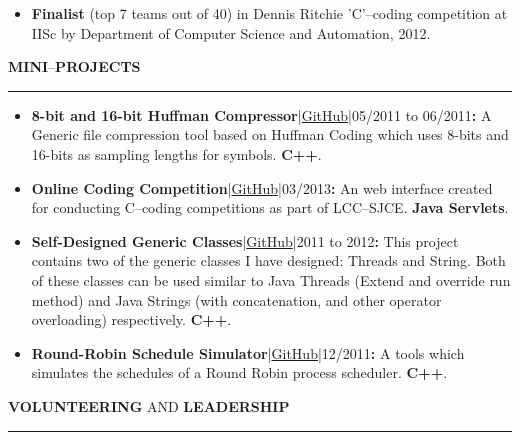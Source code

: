 \documentclass[a4paper, 10pt]{extarticle}
\begin{document}
\begin{large}
\begin{itemize}
{\begin{itemize}
            \item{\textbf{Finalist} (top 7 teams out of 40) in Dennis Ritchie 'C'--coding competition at IISc by Department of Computer Science and Automation, 2012.}
        \end{itemize}
    }    
\end{itemize}


\begin{flushleft}
{\LARGE{\textbf{M}}\Large{\textbf{INI}}\large{--}\LARGE{\textbf{P}}\Large{\textbf{ROJECTS}}}
\end{flushleft}
\vspace{-.2cm} \hrule \vspace{-.1cm}

\begin{itemize}
     \setlength\itemsep{-0.01 cm}
    \item{\textbf{8-bit and 16-bit Huffman Compressor}|\href{https://github.com/pradeep0605/HuffmanCompressor}{GitHub}|05/2011 to 06/2011\textbf{{\Large{:}}} A Generic file compression tool based on Huffman Coding which uses 8-bits and 16-bits as sampling lengths for symbols. \textbf{C++}.} 
    
    
    \item{\textbf{Online Coding Competition}|\href{https://github.com/pradeep0605/LCC-SJCE_OnlineCodingWebInterface}{GitHub}|03/2013\textbf{{\Large{:}}} An web interface created for conducting C--coding competitions as part of LCC--SJCE. \textbf{Java Servlets}.} 
    
    \item{\textbf{Self-Designed Generic Classes}|\href{https://github.com/pradeep0605/GenericClasses}{GitHub}|2011 to 2012\textbf{{\Large{:}}} This project contains two of the generic classes I have designed: Threads and String. Both of these classes can be used similar to Java Threads (Extend and override run method) and Java Strings (with concatenation, and other operator overloading) respectively. \textbf{C++}.} 
    
    \item{\textbf{Round-Robin Schedule Simulator}|\href{https://github.com/pradeep0605/RoundRobinScheduleSimulator}{GitHub}|12/2011\textbf{{\Large{:}}} A tools which simulates the schedules of a Round Robin process scheduler. \textbf{C++}.} 
\end{itemize}
\vspace{.2cm}

\begin{flushleft}
{\LARGE{\textbf{V}}\Large{\textbf{OLUNTEERING}} \large{AND} \LARGE{\textbf{L}}\Large{\textbf{EADERSHIP}}}
\end{flushleft}
\vspace{-.2cm} \hrule \vspace{-.1cm}


\end{large}
\end{document}
